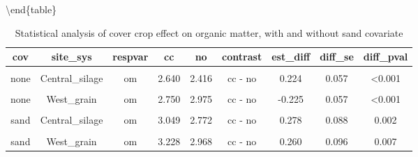 \documentclass[
]{article}
\begin{document}
\textbackslash end\{table\}

\begin{table}[H]

\caption{\label{tab:om}Statistical analysis of cover crop effect on organic matter, with and without sand covariate}
\centering
\begin{tabular}[t]{ccccccccc}
\toprule
cov & site\_sys & respvar & cc & no & contrast & est\_diff & diff\_se & diff\_pval\\
\midrule
\cellcolor{gray!6}{none} & \cellcolor{gray!6}{Central\_grain} & \cellcolor{gray!6}{om} & \cellcolor{gray!6}{2.360} & \cellcolor{gray!6}{2.480} & \cellcolor{gray!6}{cc - no} & \cellcolor{gray!6}{-0.120} & \cellcolor{gray!6}{0.051} & \cellcolor{gray!6}{0.02}\\
\cmidrule{1-9}
none & Central\_silage & om & 2.640 & 2.416 & cc - no & 0.224 & 0.057 & <0.001\\
\cmidrule{1-9}
\cellcolor{gray!6}{none} & \cellcolor{gray!6}{East\_grain} & \cellcolor{gray!6}{om} & \cellcolor{gray!6}{3.575} & \cellcolor{gray!6}{3.675} & \cellcolor{gray!6}{cc - no} & \cellcolor{gray!6}{-0.100} & \cellcolor{gray!6}{0.057} & \cellcolor{gray!6}{0.082}\\
\cmidrule{1-9}
none & West\_grain & om & 2.750 & 2.975 & cc - no & -0.225 & 0.057 & <0.001\\
\cmidrule{1-9}
\cellcolor{gray!6}{sand} & \cellcolor{gray!6}{Central\_grain} & \cellcolor{gray!6}{om} & \cellcolor{gray!6}{3.034} & \cellcolor{gray!6}{3.066} & \cellcolor{gray!6}{cc - no} & \cellcolor{gray!6}{-0.032} & \cellcolor{gray!6}{0.082} & \cellcolor{gray!6}{0.696}\\
\cmidrule{1-9}
sand & Central\_silage & om & 3.049 & 2.772 & cc - no & 0.278 & 0.088 & 0.002\\
\cmidrule{1-9}
\cellcolor{gray!6}{sand} & \cellcolor{gray!6}{East\_grain} & \cellcolor{gray!6}{om} & \cellcolor{gray!6}{2.290} & \cellcolor{gray!6}{2.105} & \cellcolor{gray!6}{cc - no} & \cellcolor{gray!6}{0.185} & \cellcolor{gray!6}{0.093} & \cellcolor{gray!6}{0.048}\\
\cmidrule{1-9}
sand & West\_grain & om & 3.228 & 2.968 & cc - no & 0.260 & 0.096 & 0.007\\
\bottomrule
\end{tabular}
\end{table}
\end{document}
